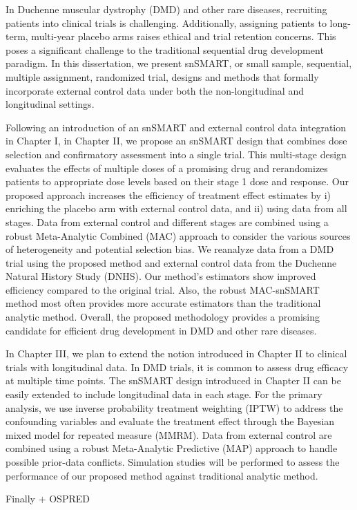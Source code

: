 In Duchenne muscular dystrophy (DMD) and other rare diseases, recruiting patients into clinical trials is challenging. Additionally, assigning patients to long-term, multi-year placebo arms raises ethical and trial retention concerns. This poses a significant challenge to the traditional sequential drug development paradigm. In this dissertation, we present snSMART, or small sample, sequential, multiple assignment, randomized trial, designs and methods that formally incorporate external control data under both the non-longitudinal and longitudinal settings. 

Following an introduction of an snSMART and external control data integration in Chapter I, in Chapter II, we propose an snSMART design that combines dose selection and confirmatory assessment into a single trial. This multi-stage design evaluates the effects of multiple doses of a promising drug and rerandomizes patients to appropriate dose levels based on their stage 1 dose and response. Our proposed approach increases the efficiency of treatment effect estimates by i) enriching the placebo arm with external control data, and ii) using data from all stages. Data from external control and different stages are combined using a robust Meta-Analytic Combined (MAC) approach to consider the various sources of heterogeneity and potential selection bias. We reanalyze data from a DMD trial using the proposed method and external control data from the Duchenne Natural History Study (DNHS). Our method's estimators show improved efficiency compared to the original trial. Also, the robust MAC-snSMART method most often provides more accurate estimators than the traditional analytic method. Overall, the proposed methodology provides a promising candidate for efficient drug development in DMD and other rare diseases.

In Chapter III, we plan to extend the notion introduced in Chapter II to clinical trials with longitudinal data. In DMD trials, it is common to assess drug efficacy at multiple time points. The snSMART design introduced in Chapter II can be easily extended to include longitudinal data in each stage. For the primary analysis, we use inverse probability treatment weighting (IPTW) to address the confounding variables and evaluate the treatment effect through the Bayesian mixed model for repeated measure (MMRM). Data from external control are combined using a robust Meta-Analytic Predictive (MAP) approach to handle possible prior-data conflicts. Simulation studies will be performed to assess the performance of our proposed method against traditional analytic method.

Finally + OSPRED 

